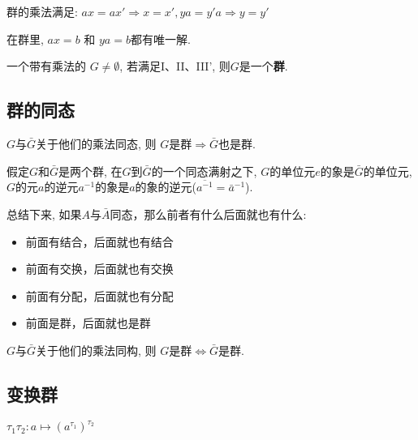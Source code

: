 \begin{Theorem}
群的乘法满足: $ax = ax' \Rightarrow x = x', ya = y'a \Rightarrow y = y'$
\end{Theorem}

\begin{Corollary}
在群里, $ax = b$ 和 $ya = b$都有唯一解.
\end{Corollary}

\begin{Theorem}[有限群的另一定义]
一个带有乘法的   $G \neq \emptyset$, 若满足I、II、III', 则$G$是一个\textbf{群}.
\end{Theorem}

\subsection{群的同态}

\begin{Theorem}
$G$与$\bar{G}$关于他们的乘法同态, 则 $G$是群$\Rightarrow \bar{G}$也是群.
\end{Theorem}

\begin{Theorem}
假定$G$和$\bar{G}$是两个群, 在$G$到$\bar{G}$的一个同态满射之下, $G$的单位元$e$的象是$\bar{G}$的单位元, $G$的元$a$的逆元$a^{-1}$的象是$a$的象的逆元($\overline{a^{-1}} = \bar{a}^{-1}$).
\end{Theorem}

\begin{Remark}
总结下来, 如果$A$与$\bar{A}$同态，那么前者有什么后面就也有什么:
\begin{itemize}
	\item 前面有结合，后面就也有结合
	\item 前面有交换，后面就也有交换
	\item 前面有分配，后面就也有分配
	\item 前面是群，后面就也是群
\end{itemize}
\end{Remark}

\begin{Theorem}
$G$与$\bar{G}$关于他们的乘法同构, 则 $G$是群$\Leftrightarrow \bar{G}$是群.
\end{Theorem}

\subsection{变换群}

\begin{Definition}[变换的乘法]
$\tau_1 \tau_2: a \mapsto {\left(a^{\tau_1}\right)}^{\tau_2}$
\end{Definition}

